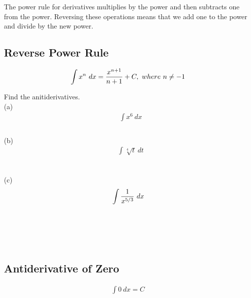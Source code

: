The power rule for derivatives multiplies by the power and then subtracts one from the power. Reversing these operations means that we add one to the power and divide by the new power. \\

\subsection{Reverse Power Rule}

\begin{theorem}
    \begin{align}
        \int x^n \ dx = {x^{n+1} \over n+1} + C,\ where\ n \ne -1
    \end{align}
\end{theorem}

\begin{exercise}\nonumber
    Find the anitiderivatives. \\

    (a)
    \begin{align}
         & \int x^6 \ dx \\
        \\
    \end{align}

    (b)
    \begin{align}
         & \int \sqrt[4]{t} \ dt \\
        \\
        \\
        \\
    \end{align}

    (c)
    \begin{align}
         & \int {1 \over x^{5/3}} \ dx \\
        \\
        \\
        \\
        \\
    \end{align}
\end{exercise}

\subsection{Antiderivative of Zero}

\begin{theorem}
    \begin{align}
        \int 0 \ dx = C
    \end{align}
\end{theorem}

